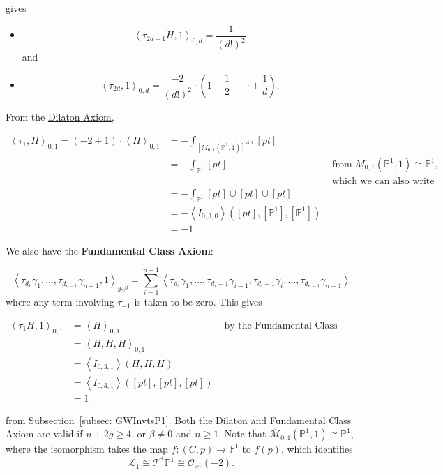 \documentclass{amsart}
\newcommand{\PP}{\mathbb{P}}\newcommand{\A}{\mathbb{A}}\newcommand{\Z}{\mathbb{Z}}\newcommand{\C}{\mathbb{C}}\newcommand{\N}{\mathbb{N}}\newcommand{\T}{\mathbb{T}}
\begin{document}
gives

\begin{itemize}
    \item[(i)] \[ \left< \tau_{2d-1}H,1\right>_{0,d} = \frac{ 1}{(d!)^2} \] and
    \item[(ii)] \cite{Pandharipande1999TheTE} 
    
    \[ \left< \tau_{2d}, 1\right>_{0,d} = \frac{-2}{(d!)^2} \cdot \left( 1 + \frac{1}{2} + \cdots + \frac{1}{d} \right). \]
\end{itemize}

From the \hyperref[axiom: dilatonAxiom]{Dilaton Axiom},

\begin{align*}
    \left<\tau_1, H\right>_{0,1} = (-2+1) \cdot \left< H \right>_{0,1} &= - \int_{ \left[M_{0,1}(\PP^1, 1) \right]^{\text{virt}}} [pt] \\
    &= - \int_{\PP^1} [pt] &\text{ from } M_{0,1}(\PP^1,1) \cong \PP^1, \\
    &&\text{ which we can also write as}\\
    &= -\int_{\PP^1} [pt] \cup [pt] \cup [pt]\\
    &= - \left< I_{0,3,0}\right>([pt], [\PP^1], [\PP^1])\\
    &= -1.
\end{align*}

We also have the \textbf{Fundamental Class Axiom}\label{axiom: FundClassAxiom}:

\[ \left< \tau_{d_1}\gamma_1, \dots, \tau_{d_{n-1}}\gamma_{n-1}, 1 \right>_{g,\beta} = \sum_{i=1}^{n-1} \left< \tau_{d_1}\gamma_1, \dots, \tau_{d_i-1}\gamma_{i-1}, \tau_{d_i - 1} \gamma_i, \dots, \tau_{d_{n-1}}\gamma_{n-1} \right>\] where any term involving $\tau_{-1}$ is taken to be zero. This gives 

\begin{align*}
    \left< \tau_1 H, 1 \right>_{0,1} &= \left< H \right>_{0,1} &\text{ by the Fundamental Class Axiom}\\
    &= \left< H,H,H\right>_{0,1} \\
    &= \left< I_{0,3,1} \right>(H,H,H) \\
    &= \left< I_{0,3,1} \right>([pt],[pt],[pt])\\
    &= 1 
\end{align*}



from Subsection~\ref{subsec: GWInvtsP1}. Both the Dilaton and Fundamental Class Axiom are valid if $n+2g\geq 4$, or $\beta\neq 0$ and $n\geq 1$. Note that $\overline{\mathcal{M}}_{0,1}(\PP^1,1) \cong \PP^1$, where the isomorphism takes the map $f: (C,p) \rightarrow \PP^1$ to $f(p)$, which identifies \[ \mathcal{L}_1 \cong \mathcal{T}^*\PP^1 \cong \mathcal{O}_{\PP^1}(-2). \] 
\end{document}
